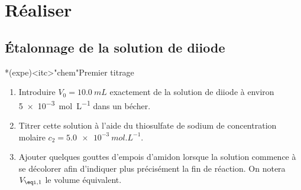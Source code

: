 \documentclass[../main/main.tex]{subfiles}
\begin{document}
\section{Réaliser}
\subsection{Étalonnage de la solution de diiode}
\begin{tcb}*(expe)<itc>"chem"{Premier titrage}
	\begin{enumerate}
		\item Introduire $V_0 = \SI{10.0}{mL}$ exactement de la solution de diiode à
		      environ \SI{5e-3}{mol.L^{-1}} dans un bécher.
		\item Titrer cette solution à l'aide du thiosulfate de sodium de
		      concentration molaire $c_2 = \SI{5.0e-3}{mol.L^{-1}}$.
		\item Ajouter quelques gouttes d'empois d'amidon lorsque la solution
		      commence à se décolorer afin d'indiquer plus précisément la fin de
		      réaction. On notera $V_{\eqi,1}$ le volume équivalent.
	\end{enumerate}
\end{tcb}

\resetQ
{}
%
%
\end{document}
